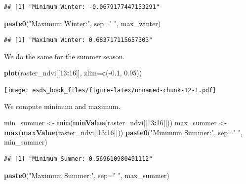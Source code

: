 \documentclass[
]{book}
\newenvironment{Shaded}{\begin{snugshade}}{\end{snugshade}}
\newcommand{\DataTypeTok}[1]{\textcolor[rgb]{0.13,0.29,0.53}{#1}}
\newcommand{\DecValTok}[1]{\textcolor[rgb]{0.00,0.00,0.81}{#1}}
\newcommand{\FloatTok}[1]{\textcolor[rgb]{0.00,0.00,0.81}{#1}}
\newcommand{\KeywordTok}[1]{\textcolor[rgb]{0.13,0.29,0.53}{\textbf{#1}}}
\newcommand{\NormalTok}[1]{#1}
\newcommand{\OperatorTok}[1]{\textcolor[rgb]{0.81,0.36,0.00}{\textbf{#1}}}
\newcommand{\StringTok}[1]{\textcolor[rgb]{0.31,0.60,0.02}{#1}}
\begin{document}
\begin{verbatim}
## [1] "Minimum Winter: -0.0679177447153291"
\end{verbatim}

\begin{Shaded}
\begin{Highlighting}[]
\KeywordTok{paste0}\NormalTok{(}\StringTok{"Maximum Winter:"}\NormalTok{, }\DataTypeTok{sep=}\StringTok{" "}\NormalTok{, max_winter)}
\end{Highlighting}
\end{Shaded}

\begin{verbatim}
## [1] "Maximum Winter: 0.683717115657303"
\end{verbatim}

We do the same for the summer season.

\begin{Shaded}
\begin{Highlighting}[]
\KeywordTok{plot}\NormalTok{(raster_ndvi[[}\DecValTok{13}\OperatorTok{:}\DecValTok{16}\NormalTok{]], }\DataTypeTok{zlim=}\KeywordTok{c}\NormalTok{(}\OperatorTok{-}\FloatTok{0.1}\NormalTok{, }\FloatTok{0.95}\NormalTok{))}
\end{Highlighting}
\end{Shaded}

\texttt{[image: esds\_book\_files/figure-latex/unnamed-chunk-12-1.pdf]}

We compute minimum and maximum.

\begin{Shaded}
\begin{Highlighting}[]
\NormalTok{min_summer <-}\StringTok{ }\KeywordTok{min}\NormalTok{(}\KeywordTok{minValue}\NormalTok{(raster_ndvi[[}\DecValTok{13}\OperatorTok{:}\DecValTok{16}\NormalTok{]]))}
\NormalTok{max_summer <-}\StringTok{ }\KeywordTok{max}\NormalTok{(}\KeywordTok{maxValue}\NormalTok{(raster_ndvi[[}\DecValTok{13}\OperatorTok{:}\DecValTok{16}\NormalTok{]]))}
\KeywordTok{paste0}\NormalTok{(}\StringTok{"Minimum Summer:"}\NormalTok{, }\DataTypeTok{sep=}\StringTok{" "}\NormalTok{, min_summer)}
\end{Highlighting}
\end{Shaded}

\begin{verbatim}
## [1] "Minimum Summer: 0.569610980491112"
\end{verbatim}

\begin{Shaded}
\begin{Highlighting}[]
\KeywordTok{paste0}\NormalTok{(}\StringTok{"Maximum Summer:"}\NormalTok{, }\DataTypeTok{sep=}\StringTok{" "}\NormalTok{, max_summer)}
\end{Highlighting}
\end{Shaded}
\end{document}
